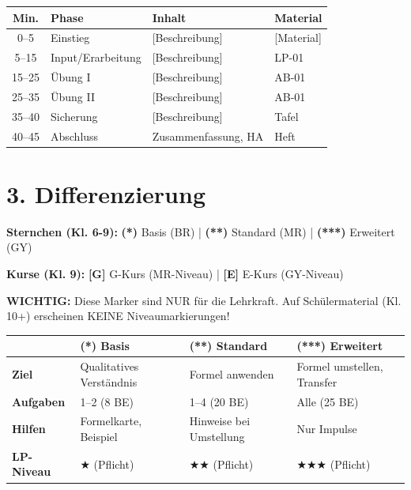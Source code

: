 \documentclass[11pt, a4paper]{article}
\newcommand{\stunde}{01}
\newcommand{\sternEins}{\textcolor{basis}{\textbf{(*)}}}
\newcommand{\sternZwei}{\textcolor{standard}{\textbf{(**)}}}
\newcommand{\sternDrei}{\textcolor{erweiterung}{\textbf{(***)}}}
\newcommand{\Gkurs}{\textcolor{basis}{\textbf{[G]}}}
\newcommand{\Ekurs}{\textcolor{erweiterung}{\textbf{[E]}}}
\begin{document}
\begin{longtable}{|c|p{2.5cm}|p{7cm}|p{3cm}|}
\hline
\textbf{Min.} & \textbf{Phase} & \textbf{Inhalt} & \textbf{Material} \\
\hline
\endhead

0--5 & Einstieg & [Beschreibung] & [Material] \\
\hline

5--15 & Input/Erarbeitung & [Beschreibung] & LP-\stunde \\
\hline

15--25 & Übung I & [Beschreibung] & AB-\stunde \\
\hline

25--35 & Übung II & [Beschreibung] & AB-\stunde \\
\hline

35--40 & Sicherung & [Beschreibung] & Tafel \\
\hline

40--45 & Abschluss & Zusammenfassung, HA & Heft \\
\hline
\end{longtable}


\section*{3. Differenzierung}

\begin{infobox}[Legende]
\textbf{Sternchen (Kl. 6-9):} \sternEins{} Basis (BR) | \sternZwei{} Standard (MR) | \sternDrei{} Erweitert (GY)

\textbf{Kurse (Kl. 9):} \Gkurs{} G-Kurs (MR-Niveau) | \Ekurs{} E-Kurs (GY-Niveau)

\textbf{WICHTIG:} Diese Marker sind NUR für die Lehrkraft. Auf Schülermaterial (Kl. 10+) erscheinen KEINE Niveaumarkierungen!
\end{infobox}

\vspace{1em}

\begin{tabular}{|l|p{4cm}|p{4cm}|p{4cm}|}
\hline
& \sternEins{} \textbf{Basis} & \sternZwei{} \textbf{Standard} & \sternDrei{} \textbf{Erweitert} \\
\hline
\textbf{Ziel} & Qualitatives Verständnis & Formel anwenden & Formel umstellen, Transfer \\
\hline
\textbf{Aufgaben} & 1--2 (8 BE) & 1--4 (20 BE) & Alle (25 BE) \\
\hline
\textbf{Hilfen} & Formelkarte, Beispiel & Hinweise bei Umstellung & Nur Impulse \\
\hline
\textbf{LP-Niveau} & ★ (Pflicht) & ★★ (Pflicht) & ★★★ (Pflicht) \\
\hline
\end{tabular}
\end{document}
